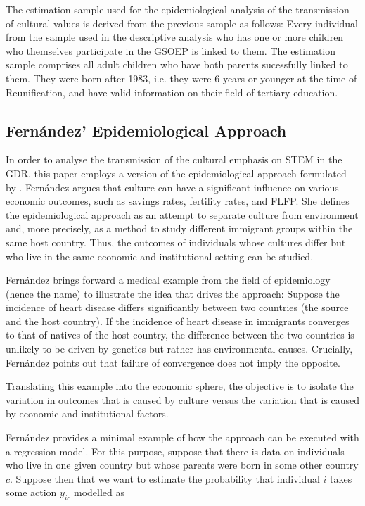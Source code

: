 \documentclass[a4paper, oneside, hyperfootnotes = false]{article}
\begin{document}
{%
The estimation sample used for the epidemiological analysis of the transmission of cultural values is derived from the previous sample as follows:
Every individual from the sample used in the descriptive analysis who has one or more children who themselves participate in the GSOEP is linked to them.
The estimation sample comprises all adult children who have both parents sucessfully linked to them.
They were born after 1983, i.e. they were 6 years or younger at the time of Reunification, and have valid information on their field of tertiary education.

\subsection{Fernández' Epidemiological Approach}
\label{epid}

In order to analyse the transmission of the cultural emphasis on STEM in the GDR, this paper employs a version of the epidemiological approach formulated by \cite{Fernandez2011}.
Fernández argues that culture can have a significant influence on various economic outcomes, such as savings rates, fertility rates, and FLFP.
She defines the epidemiological approach as an attempt to separate culture from environment and, more precisely, as a method to study different immigrant groups within the same host country. %
Thus, the outcomes of individuals whose cultures differ but who live in the same economic and institutional setting can be studied.

Fernández brings forward a medical example from the field of epidemiology (hence the name) to illustrate the idea that drives the approach:
Suppose the incidence of heart disease differs significantly between two countries (the source and the host country).
If the incidence of heart disease in immigrants converges to that of natives of the host country, the difference between the two countries is unlikely to be driven by genetics but rather has environmental causes.
Crucially, Fernández points out that failure of convergence does not imply the opposite.

Translating this example into the economic sphere, the objective is to isolate the variation in outcomes that is caused by culture versus the variation that is caused by economic and institutional factors.

Fernández provides a minimal example of how the approach can be executed with a regression model.
For this purpose, suppose that there is data on individuals who live in one given country but whose parents were born in some other country $c$.
Suppose then that we want to estimate the probability that individual $i$ takes some action $y_{ic}$ modelled as

}
\end{document}
